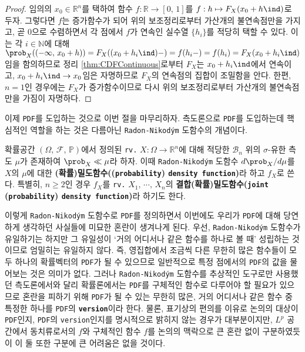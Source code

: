 \begin{proof}
    임의의 $x_0\in\mathbb{R}^n$를 택하여 함수 $f:\mathbb{R}\to[0,\,1]$를 $f:h\mapsto F_X(x_0+h\ind)$로 두자. 그렇다면 $f$는 증가함수가 되어 위의 보조정리로부터 가산개의 불연속점만을 가지고, 곧 $0$으로 수렴하면서 각 점에서 $f$가 연속인 실수열 $\{h_i\}$를 적당히 택할 수 있다. 이는 각 $i\in\mathbb{N}$에 대해 $\prob_X((-\infty,\,x_0+h))=F_X((x_0+h_i\ind)-)=f(h_i-)=f(h_i)=F_X(x_0+h_i\ind)$임을 함의하므로 정리 \ref{thm:CDFContinuous}로부터 $F_X$는 $x_0+h_i\ind$에서 연속이고, $x_0+h_i\ind\to x_0$임은 자명하므로 $F_X$의 연속점의 집합이 조밀함을 안다. 한편, $n=1$인 경우에는 $F_X$가 증가함수이므로 다시 위의 보조정리로부터 가산개의 불연속점만을 가짐이 자명하다.
\end{proof}

이제 \texttt{PDF}를 도입하는 것으로 이번 절을 마무리하자. 측도론으로 \texttt{PDF}를 도입하는데 핵심적인 역할을 하는 것은 다름아닌 \texttt{Radon-Nikod\'ym} 도함수의 개념이다.

\begin{definition}
    확률공간 $(\Omega,\,\mathcal{F},\,\mathbb{P})$에서 정의된 \texttt{rv.} $X:\Omega\to\mathbb{R}^n$에 대해 적당한 $\mathcal{B}_n$ 위의 $\sigma$-유한 측도 $\mu$가 존재하여 $\prob_X\ll\mu$라 하자. 이때 \texttt{Radon-Nikod\'ym} 도함수 $d\prob_X/d\mu$를 $X$의 $\mu$에 대한 \textbf{(확률)밀도함수((\texttt{probability}) \texttt{density function})}라 하고 $f_X$로 쓴다. 특별히, $n\geq2$인 경우 $f_X$를 \texttt{rv.} $X_1,\,\cdots,\,X_n$의 \textbf{결합(확률)밀도함수(\texttt{joint} (\texttt{probability}) \texttt{density function})}라 하기도 한다.
\end{definition}

이렇게 \texttt{Radon-Nikod\'ym} 도함수로 \texttt{PDF}를 정의하면서 이번에도 우리가 \texttt{PDF}에 대해 당연하게 생각하던 사실들에 미묘한 혼란이 생겨나게 된다. 우선, \texttt{Radon-Nikod\'ym} 도함수가 유일하기는 하지만 그 유일성이 `거의 어디서나 같은 함수를 하나로 볼 때' 성립하는 것이므로 엄밀히는 유일하지 않다. 즉, 영집합에서 조금씩 다른 무한히 많은 함수들이 모두 하나의 확률벡터의 \texttt{PDF}가 될 수 있으므로 일반적으로 특정 점에서의 \texttt{PDF}의 값을 물어보는 것은 의미가 없다. 그러나 \texttt{Radon-Nikod\'ym} 도함수를 추상적인 도구로만 사용했던 측도론에서와 달리 확률론에서는 \texttt{PDF}를 구체적인 함수로 다루어야 할 필요가 있으므로 혼란을 피하기 위해 \texttt{PDF}가 될 수 있는 무한히 많은, 거의 어디서나 같은 함수 중 특정한 하나를 \texttt{PDF}의 \textbf{\texttt{version}}이라 한다. 물론, 표기상의 편의를 이유로 논의의 대상이 \texttt{PDF}인지, \texttt{PDF}의 \texttt{version}인지를 명시적으로 밝히지 않는 경우가 대부분이지만, $L^p$ 공간에서 동치류로서의 $f$와 구체적인 함수 $f$를 논의의 맥락으로 큰 혼란 없이 구분하였듯이 이 둘 또한 구분에 큰 어려움은 없을 것이다.

